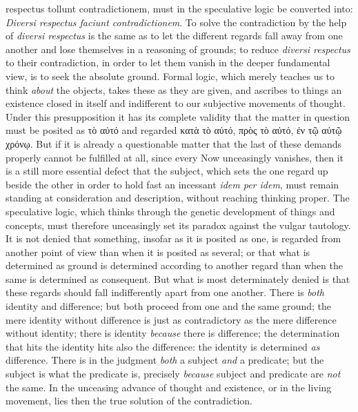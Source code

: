 \documentclass[12pt]{book}
\begin{document}
\begin{itemize}
{  respectus tollunt contradictionem}, must in the speculative logic be
  converted into: \textit{Diversi respectus faciunt contradictionem}. To
  solve the contradiction by the help of \textit{diversi respectus} is the
  same as to let the different regards fall away from one another and lose
  themselves in a reasoning of grounds; to reduce \textit{diversi respectus}
  to their contradiction, in order to let them vanish in the deeper
  fundamental view, is to seek the absolute ground. Formal logic, which
  merely teaches us to think \emph{about} the objects, takes these as they
  are given, and ascribes to things an existence closed in itself and
  indifferent to our subjective movements of thought. Under this
  presupposition it has its complete validity that the matter in question
  must be posited as τὸ αὐτό and regarded κατὰ τὸ αὐτό, πρὸς τὸ αὐτό,
  ἐν τῷ αὐτῷ χρόνῳ. But if it is already a questionable matter that the last
  of these demands properly cannot be fulfilled at all, since every Now
  unceasingly vanishes, then it is a still more essential defect that the
  subject, which sets the one regard up beside the other in order to hold
  fast an incessant \textit{idem per idem}, must remain standing at
  consideration and description, without reaching thinking proper. The
  speculative logic, which thinks through the genetic development of things
  and concepts, must therefore unceasingly set its paradox against the
  vulgar tautology. It is not denied that something, insofar as it is
  posited as one, is regarded from another point of view than when it is
  posited as several; or that what is determined as ground is determined
  according to another regard than when the same is determined as
  consequent. But what is most determinately denied is that these regards
  should fall indifferently apart from one another. There is \emph{both}
  identity and difference; but both proceed from one and the same ground;
  the mere identity without difference is just as contradictory as the mere
  difference without identity; there is identity \emph{because} there is
  difference; the determination that hits the identity hits also the
  difference: the identity is determined \emph{as} difference. There is in
  the judgment \emph{both} a subject \emph{and} a predicate; but the subject
  is what the predicate is, precisely \emph{because} subject and predicate
  are \emph{not} the same. In the unceasing advance of thought and
  existence, or in the living movement, lies then the true solution of the
  contradiction.
\end{itemize}
\end{document}
